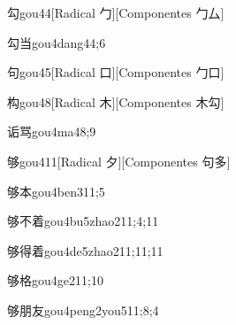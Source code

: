 \begin{verbete}{勾}{gou4}{4}[Radical ⼓][Componentes ⼓⼛]
\end{verbete}

\begin{verbete}{勾当}{gou4dang4}{4;6}
\end{verbete}

\begin{verbete}{句}{gou4}{5}[Radical 口][Componentes 勹口]
\end{verbete}

\begin{verbete}{构}{gou4}{8}[Radical ⽊][Componentes ⽊勾]
\end{verbete}

\begin{verbete}{诟骂}{gou4ma4}{8;9}
\end{verbete}

\begin{verbete}{够}{gou4}{11}[Radical ⼣][Componentes 句多]
\end{verbete}

\begin{verbete}{够本}{gou4ben3}{11;5}
\end{verbete}

\begin{verbete}{够不着}{gou4bu5zhao2}{11;4;11}
\end{verbete}

\begin{verbete}{够得着}{gou4de5zhao2}{11;11;11}
\end{verbete}

\begin{verbete}{够格}{gou4ge2}{11;10}
\end{verbete}

\begin{verbete}{够朋友}{gou4peng2you5}{11;8;4}
\end{verbete}

